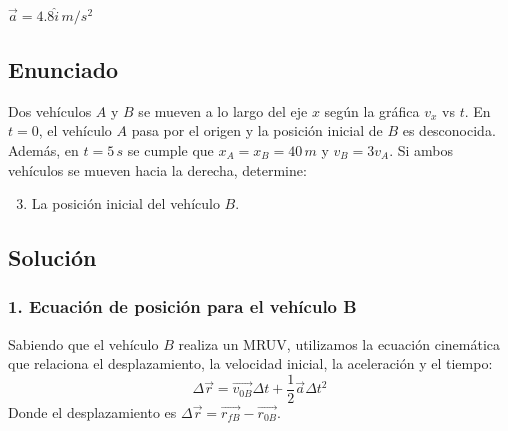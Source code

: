 \documentclass[12pt, a4paper]{article}
\begin{document}
\begin{tcolorbox}[colback=green!5!white, colframe=green!50!black, title=Respuesta Final]
\centering $\vec{a} = 4.8\hat{i} \, \si{m/s^2}$
\end{tcolorbox}

\newpage

\subsection*{Enunciado}
Dos vehículos $A$ y $B$ se mueven a lo largo del eje $x$ según la gráfica $v_x$ vs $t$. En $t = 0$, el vehículo $A$ pasa por el origen y la posición inicial de $B$ es desconocida. Además, en $t = 5 \, \si{s}$ se cumple que $x_A = x_B = 40 \, \si{m}$ y $v_B = 3v_A$. Si ambos vehículos se mueven hacia la derecha, determine:
\begin{enumerate}[label=\alph*)]
    \setcounter{enumi}{2}
    \item La posición inicial del vehículo $B$.
\end{enumerate}

\begin{center}
\end{center}

\subsection*{Solución}

\subsubsection*{1. Ecuación de posición para el vehículo B}
Sabiendo que el vehículo $B$ realiza un MRUV, utilizamos la ecuación cinemática que relaciona el desplazamiento, la velocidad inicial, la aceleración y el tiempo:
$$ \Delta \vec{r} = \vec{v_{0B}} \Delta t + \frac{1}{2} \vec{a} \Delta t^2 $$
Donde el desplazamiento es $\Delta \vec{r} = \vec{r_{fB}} - \vec{r_{0B}}$. 
\end{document}
